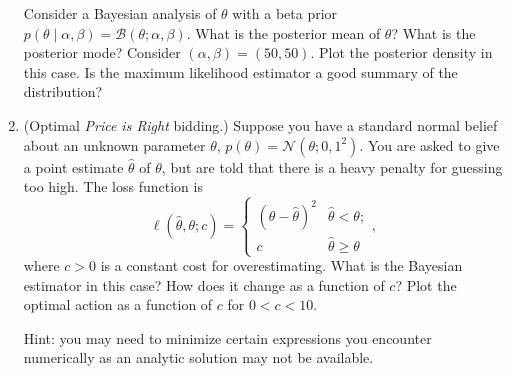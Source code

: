 \documentclass{article}
\newcommand{\given}{\mid}
\newcommand{\mc}[1]{\mathcal{#1}}
\begin{document}
\begin{enumerate}
  Consider a Bayesian analysis of $\theta$ with a beta prior $p(\theta
  \given \alpha, \beta) = \mc{B}(\theta; \alpha, \beta)$.  What is the
  posterior mean of $\theta$?  What is the posterior mode?  Consider
  $(\alpha, \beta) = (50, 50)$.  Plot the posterior density in this
  case.  Is the maximum likelihood estimator a good summary of the
  distribution?

\item
  (Optimal \emph{Price is Right} bidding.)
  Suppose you have a standard normal belief about an unknown parameter
  $\theta$, $p(\theta) = \mc{N}(\theta; 0, 1^2)$.  You are asked to
  give a point estimate $\hat{\theta}$ of $\theta$, but are told that
  there is a heavy penalty for guessing too high.  The loss function is
  \begin{equation*}
    \ell(\hat{\theta}, \theta; c)
    =
    \begin{cases}
      (\theta - \hat{\theta})^2 & \hat{\theta}  <   \theta; \\
      c                         & \hat{\theta} \geq \theta
    \end{cases},
  \end{equation*}
  where $c > 0$ is a constant cost for overestimating.  What is the Bayesian
  estimator in this case?  How does it change as a function of $c$? Plot the
  optimal action as a function of $c$ for $0 < c < 10$.

  Hint: you may need to minimize certain expressions you encounter numerically
  as an analytic solution may not be available.

\end{enumerate}
\end{document}
